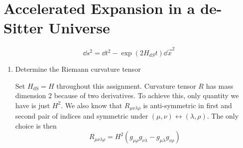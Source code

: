 \section{Accelerated Expansion in a de-Sitter Universe}
\begin{equation}
   \dd{s^2} = \dd{t^2} - \exp(2 H_{dS} t) \dd{\vec{x}^2}
\end{equation}

\begin{enumerate}[label=(\alph*)]
   \item Determine the Riemann curvature tensor
   
      Set $H_\text{dS} = H$ throughout this assignment.
      Curvature tensor $R$ has mass dimension $2$ because of two derivatives. To achieve this, only quantity we have is just $H^2$. We also know that $R_{\mu\nu\lambda \rho}$ is anti-symmetric in first and second pair of indices and symmetric under $(\mu, \nu) \leftrightarrow (\lambda, \rho)$. The only choice is then
      \begin{equation}
         R_{\mu\nu\lambda \rho} = H^2 (g_{\mu\rho} g_{\nu\lambda} - g_{\mu\lambda} g_{\nu\rho})
      \end{equation}


\end{enumerate}

